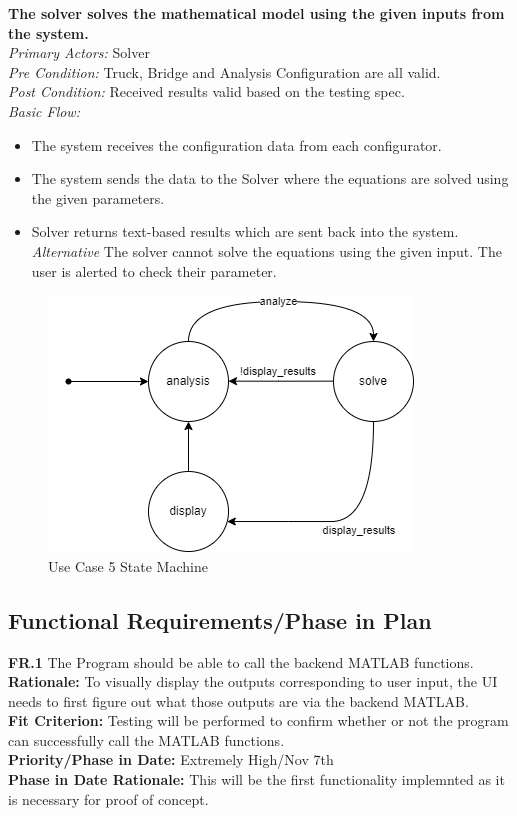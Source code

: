 \documentclass[12pt]{article}
\begin{document}
\noindent
\textbf{The solver solves the mathematical model using the given inputs from the system.} \\
\emph{  Primary Actors:} Solver\\
\emph{  Pre Condition:} Truck, Bridge and Analysis Configuration are all valid.\\
\emph{  Post Condition:} Received results valid based on the testing spec.\\ 
\emph{  Basic Flow:} 
\begin{itemize}
\item The system receives the configuration data from each configurator. 
\item The system sends the data to the Solver where the equations are solved using the given parameters. 
\item Solver returns text-based results which are sent back into the system. 
\subitem \emph{Alternative} The solver cannot solve the equations using the given input. The user is alerted to check their parameter. 
\end{itemize}
\begin{figure}[H]
  \centering
  \includegraphics[width=0.5\linewidth]{use-case-5-sm.png}
  \caption{Use Case 5 State Machine}
  \label {fig:use-case-5-sm}
\end{figure}

\subsection{Functional Requirements/Phase in Plan}
  \textbf{FR.1} The Program should be able to call the backend MATLAB functions. \\
  \textbf{Rationale:} To visually display the outputs corresponding to user input, the UI needs to first figure out what those outputs are via the backend MATLAB.\\
  \textbf{Fit Criterion:} Testing will be performed to confirm whether or not the program can successfully call the MATLAB functions.\\
  \textbf{Priority/Phase in Date:} Extremely High/Nov 7th\\
  \textbf{Phase in Date Rationale:} This will be the first functionality implemnted as it is necessary for proof of concept.\\\\
  
\end{document}
